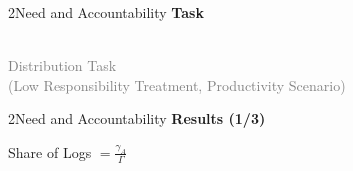 \documentclass[xcolor=table,9pt,aspectratio=169]{beamer}
\begin{document}
\begin{frame}{\vspace*{10mm}2\hspace*{1em}Need and Accountability}
\textbf{Task}\\
\medskip
\begin{center}
   \\
   \textcolor{gray}{Distribution Task\\(Low Responsibility Treatment, Productivity Scenario)}
\end{center}
\end{frame}


\begin{frame}{\vspace*{10mm}2\hspace*{1em}Need and Accountability}
\textbf{Results (1/3)}\\
\medskip
\begin{center}
   Share of Logs $=\frac{\gamma_{A}}{\Gamma}$
\end{center}
\end{frame}
\end{document}
